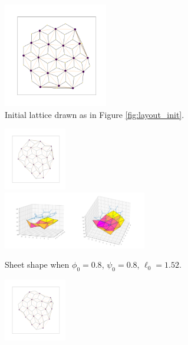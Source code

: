\begin{figure}[htbp]
    \centering
    \begin{subfigure}[b]{\textwidth}
        \centering
        \includegraphics[width=0.5\textwidth]{hexnoise/hexnoise_graph.png}
        \caption{Initial lattice drawn as in Figure \ref{fig:layout_init}.}
        \label{subfig:hexnoise_graph}
    \end{subfigure}
    \begin{subfigure}[b]{\textwidth}
        \centering
        \includegraphics[width=0.3\textwidth]{hexnoise/hexnoise0.8_0.8_1.52_10_graph.png}
        \includegraphics[width=0.69\textwidth]{hexnoise/hexnoise0.8_0.8_1.52_10_plot.png}
        \caption{Sheet shape when $\phi_0=0.8$, $\psi_0=0.8$, $\ell_0=1.52$.}
        \label{subfig:hexnoise_in}
    \end{subfigure}
    \begin{subfigure}[b]{\textwidth}
        \centering
        \includegraphics[width=0.3\textwidth]{hexnoise/hexnoise0.95_0.8_1.52_10_graph.png}

\end{subfigure}
\end{figure}
